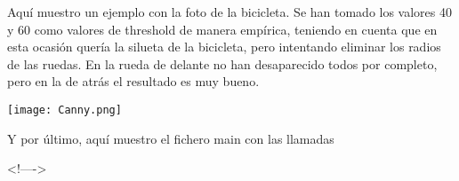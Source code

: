 \documentclass[a4paper, 11pt]{article}
\newcommand{\includecode}[2][c]{<!---->}
\theoremstyle{definition}
\begin{document}
  Aquí muestro un ejemplo con la foto de la bicicleta. Se han tomado los valores
  40 y 60 como valores de threshold de manera empírica, teniendo en cuenta que
  en esta ocasión quería la silueta de la bicicleta, pero intentando eliminar los
  radios de las ruedas. En la rueda de delante no han desaparecido todos por completo,
  pero en la de atrás el resultado es muy bueno.


  \centerline{\texttt{[image: Canny.png]}}

  Y por último, aquí muestro el fichero main con las llamadas

  \includecode{../src/main.cpp}
\end{document}
